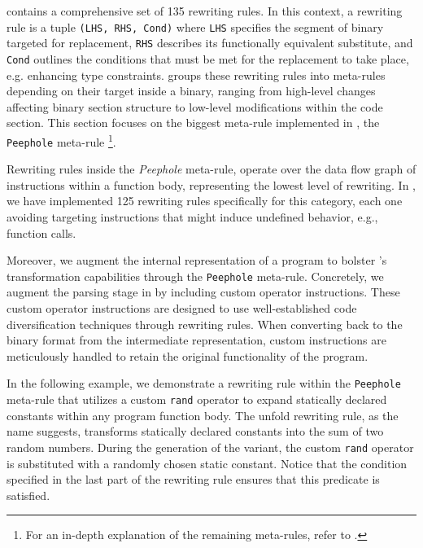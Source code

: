\label{custom}

\tool contains a comprehensive set of 135 rewriting rules.
In this context, a rewriting rule is a tuple \texttt{(LHS, RHS, Cond)} where \texttt{LHS} specifies the segment of binary targeted for replacement, \texttt{RHS} describes its functionally equivalent substitute, and \texttt{Cond} outlines the conditions that must be met for the replacement to take place, e.g. enhancing type constraints.
\tool groups these rewriting rules into meta-rules depending on their target inside a \wasm binary, ranging from high-level changes affecting binary section structure to low-level modifications within the code section. 
This section focuses on the biggest meta-rule implemented in \tool, the \texttt{Peephole} meta-rule \footnote{For an in-depth explanation of the remaining meta-rules, refer to \cite{wasmmutate}.}. 

Rewriting rules inside the \emph{Peephole} meta-rule, operate over the data flow graph of instructions within a function body, representing the lowest level of rewriting.  
In \tool, we have implemented 125 rewriting rules specifically for this category, each one avoiding targeting instructions that might induce undefined behavior, e.g., function calls.

Moreover, we augment the internal representation of a \wasm program to bolster \tool's transformation capabilities through the \texttt{Peephole} meta-rule.
Concretely, we augment the parsing stage in \tool by including custom operator instructions.
These custom operator instructions are designed to use well-established code diversification techniques through rewriting rules.
When converting back to the \Wasm binary format from the intermediate representation, custom instructions are meticulously handled to retain the original functionality of the \Wasm program. 


In the following example, we demonstrate a rewriting rule within the \texttt{Peephole} meta-rule that utilizes a custom \texttt{rand} operator to expand statically declared constants within any \Wasm program function body. 
The unfold rewriting rule, as the name suggests, transforms statically declared constants into the sum of two random numbers.
During the generation of the \Wasm variant, the custom \texttt{rand} operator is substituted with a randomly chosen static constant.
Notice that the condition specified in the last part of the rewriting rule ensures that this predicate is satisfied. 


